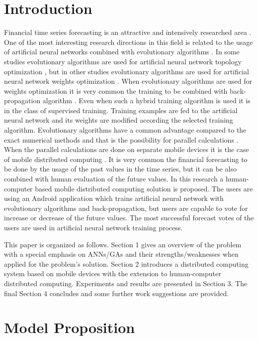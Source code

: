 \documentclass[runningheads]{llncs}
\begin{document}
\section{Introduction} \label{Introduction}

Financial time series forecasting is an attractive and intensively researched area \cite{nava01}. One of the most interesting research directions in this field is related to the usage of artificial neural networks combined with evolutionary algorithms \cite{zhang01}. In some studies evolutionary algorithms are used for artificial neural network topology optimization \cite{kapanova01}, but in other studies evolutionary algorithms are used for artificial neural network weights optimization \cite{aljarah01}. When evolutionary algorithms are used for weights optimization it is very common the training to be combined with back-propagation algorithm \cite{balabanov02}. Even when such a hybrid training algorithm is used it is in the class of supervised training. Training examples are fed to the artificial neural network and its weights are modified according the selected training algorithm. Evolutionary algorithms have a common advantage compared to the exact numerical methods and that is the possibility for parallel calculations \cite{altinoz01}. When the parallel calculations are done on separate mobile devices it is the case of mobile distributed computing \cite{sharma01}. It is very common the financial forecasting to be done by the usage of the past values in the time series, but it can be also combined with human evaluation of the future values. In this research a human-computer based mobile distributed computing solution is proposed. The users are using an Android application which trains artificial neural network with evolutionary algorithms and back-propagation, but users are capable to vote for increase or decrease of the future values. The most successful forecast votes of the users are used in artificial neural network training process.

This paper is organized as follows. Section 1 gives an overview of the problem  with a special emphasis on ANNs/GAs and their strengths/weaknesses when applied for the problem's solution. Section 2 introduces a distributed computing system based on mobile devices with the extension to human-computer distributed computing. Experiments and results are presented in Section 3. The final Section 4 concludes and some further work suggestions are provided. 

\section{Model Proposition} \label{Model Proposition}
\end{document}
